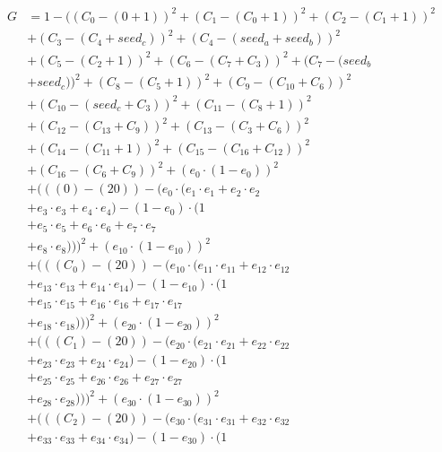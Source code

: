 \documentclass[10pt, a4paper]{article}
\begin{document}
\begin{small}
\begin{align*}
G &= 1 - ((C_{0} - (0 + 1))^{2} + (C_{1} - (C_{0} + 1))^{2} + (C_{2} - (C_{1} + 1))^{2} \\
& + (C_{3} - (C_{4} + seed_c))^{2} + (C_{4} - (seed_a + seed_b))^{2} \\
& + (C_{5} - (C_{2} + 1))^{2} + (C_{6} - (C_{7} + C_{3}))^{2} + (C_{7} - (seed_b \\
& + seed_c))^{2} + (C_{8} - (C_{5} + 1))^{2} + (C_{9} - (C_{10} + C_{6}))^{2} \\
& + (C_{10} - (seed_c + C_{3}))^{2} + (C_{11} - (C_{8} + 1))^{2} \\
& + (C_{12} - (C_{13} + C_{9}))^{2} + (C_{13} - (C_{3} + C_{6}))^{2} \\
& + (C_{14} - (C_{11} + 1))^{2} + (C_{15} - (C_{16} + C_{12}))^{2} \\
& + (C_{16} - (C_{6} + C_{9}))^{2} + (e_{0} \cdot (1 - e_{0}))^{2} \\
& + (((0) - (20)) - (e_{0} \cdot (e_{1} \cdot e_{1} + e_{2} \cdot e_{2} \\
& + e_{3} \cdot e_{3} + e_{4} \cdot e_{4}) - (1 - e_{0}) \cdot (1 \\
& + e_{5} \cdot e_{5} + e_{6} \cdot e_{6} + e_{7} \cdot e_{7} \\
& + e_{8} \cdot e_{8})))^{2} + (e_{10} \cdot (1 - e_{10}))^{2} \\
& + (((C_{0}) - (20)) - (e_{10} \cdot (e_{11} \cdot e_{11} + e_{12} \cdot e_{12} \\
& + e_{13} \cdot e_{13} + e_{14} \cdot e_{14}) - (1 - e_{10}) \cdot (1 \\
& + e_{15} \cdot e_{15} + e_{16} \cdot e_{16} + e_{17} \cdot e_{17} \\
& + e_{18} \cdot e_{18})))^{2} + (e_{20} \cdot (1 - e_{20}))^{2} \\
& + (((C_{1}) - (20)) - (e_{20} \cdot (e_{21} \cdot e_{21} + e_{22} \cdot e_{22} \\
& + e_{23} \cdot e_{23} + e_{24} \cdot e_{24}) - (1 - e_{20}) \cdot (1 \\
& + e_{25} \cdot e_{25} + e_{26} \cdot e_{26} + e_{27} \cdot e_{27} \\
& + e_{28} \cdot e_{28})))^{2} + (e_{30} \cdot (1 - e_{30}))^{2} \\
& + (((C_{2}) - (20)) - (e_{30} \cdot (e_{31} \cdot e_{31} + e_{32} \cdot e_{32} \\
& + e_{33} \cdot e_{33} + e_{34} \cdot e_{34}) - (1 - e_{30}) \cdot (1 \\

\end{align*}
\end{small}
\end{document}
